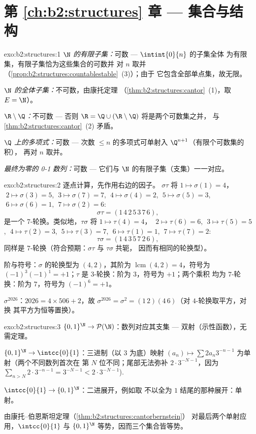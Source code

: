 \section*{第 \ref{ch:b2:structures} 章 --- 集合与结构}

\begin{solution}{exo:b2:structures:1}
\emph{$\N$ 的有限子集：}可数 --- $\intint{0}{n}$ 的子集全体
为有限集，有限子集恰为这些集合的可数并
对 $n$ 取并
（\cref{prop:b2:structures:countablestable}~(3)）；由于
它包含全部单点集，故无限。

\emph{$\N$ 的全体子集：}不可数，由康托定理
（\cref{thm:b2:structures:cantor}~(1)，取 $E = \N$）。

\emph{$\R \setminus \Q$：}不可数 --- 否则 $\R = \Q \cup
(\R\setminus\Q)$ 将是两个可数集之并，
与 \cref{thm:b2:structures:cantor}~(2) 矛盾。

\emph{$\Q$ 上的多项式：}可数 --- 次数
$\leq n$ 的多项式可单射入 $\Q^{n+1}$（有限个可数集的积），
再对 $n$ 取并。

\emph{最终为零的 0-1 数列：}可数 --- 它们与
$\N$ 的有限子集（支集）一一对应。
\end{solution}

\begin{solution}{exo:b2:structures:2}
逐点计算，先作用右边的因子。
$\sigma\tau$ 将 $1 \mapsto \sigma(1) = 4$，$\;2 \mapsto \sigma(3)
= 5$, $\;3 \mapsto \sigma(7) = 7$, $\;4 \mapsto \sigma(4) = 2$, $\;5
\mapsto \sigma(5) = 3$, $\;6 \mapsto \sigma(6) = 1$, $\;7 \mapsto
\sigma(2) = 6$:
\[
\sigma\tau = (1\,4\,2\,5\,3\,7\,6),
\]
是一个 $7$-轮换。类似地，$\tau\sigma$ 将 $1 \mapsto \tau(4) = 4$，
$\;2 \mapsto \tau(6) = 6$, $\;3 \mapsto \tau(5) = 5$, $\;4 \mapsto
\tau(2) = 3$, $\;5 \mapsto \tau(3) = 7$, $\;6 \mapsto \tau(1) = 1$,
$\;7 \mapsto \tau(7) = 2$:
\[
\tau\sigma = (1\,4\,3\,5\,7\,2\,6),
\]
同样是 $7$-轮换（符合预期：$\sigma\tau$ 与 $\tau\sigma$ 共轭，
因而有相同的轮换型）。

阶与符号：$\sigma$ 的轮换型为 $(4,2)$，其阶为
$\operatorname{lcm}(4,2) = 4$，符号为 $(-1)^3(-1)^1 = +1$；$\tau$
是 $3$-轮换：阶为 $3$，符号为 $+1$；两个乘积
均为 $7$-轮换：阶为 $7$，符号为 $(-1)^6 = +1$。

$\sigma^{2026}$：$2026 = 4 \times 506 + 2$，故 $\sigma^{2026} =
\sigma^2 = (1\,2)(4\,6)$（对 $4$-轮换取平方，对换
其平方为恒等置换）。
\end{solution}

\begin{solution}{exo:b2:structures:3}
$\{0,1\}^{\N} \to \mathcal{P}(\N)$：数列对应其支集
--- 双射（示性函数），无需定理。

$\{0,1\}^{\N} \to \intcc{0}{1}$：三进制（以 $3$ 为底）映射 $(a_n) \mapsto
\sum 2a_n 3^{-n-1}$ 为单射（两个不同数列首次在
第 $N$ 位不同；尾部无法弥补 $2\cdot
3^{-N-1}$，因为 $\sum_{n > N} 2\cdot 3^{-n-1} = 3^{-N-1} <
2\cdot3^{-N-1}$).

$\intcc{0}{1} \to \{0,1\}^{\N}$：二进展开，例如取
不以全为 $1$ 结尾的那种展开：单射。

由康托–伯恩斯坦定理（\cref{thm:b2:structures:cantorbernstein}）
对最后两个单射应用，$\intcc{0}{1}$ 与
$\{0,1\}^{\N}$ 等势，因而三个集合皆等势。
\end{solution}

